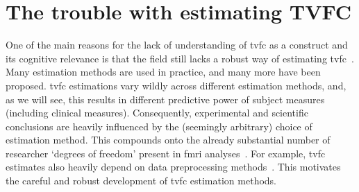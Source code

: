\clearpage
\section{The trouble with estimating TVFC}

One of the main reasons for the lack of understanding of \gls{tvfc} as a construct and its cognitive relevance is that the field still lacks a robust way of estimating \gls{tvfc}~\parencite{Foti2019, Lurie2020}.
Many estimation methods are used in practice, and many more have been proposed.
\gls{tvfc} estimations vary wildly across different estimation methods, and, as we will see, this results in different predictive power of subject measures (including clinical measures).
Consequently, experimental and scientific conclusions are heavily influenced by the (seemingly arbitrary) choice of estimation method.
%
This compounds onto the already substantial number of researcher `degrees of freedom' present in \gls{fmri} analyses~\parencite{Gelman2013, Dafflon2022}.
For example, \gls{tvfc} estimates also heavily depend on data preprocessing methods~\parencite{Luppi2021b}.
%
This motivates the careful and robust development of \gls{tvfc} estimation methods.

